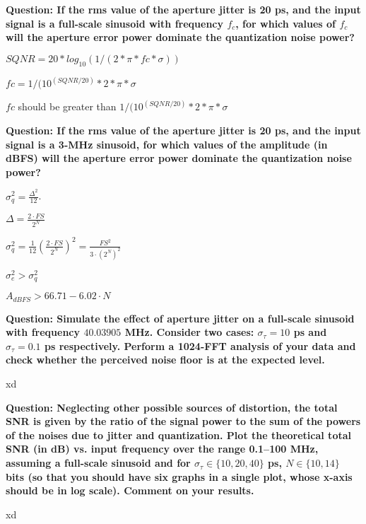 \textbf{Question: If the rms value of the aperture jitter is 20 ps, and the input signal is a full-scale sinusoid with frequency $f_c$,
    for which values of $f_c$ will the aperture error power dominate the quantization noise power?
}
\vspace{0.5cm}

$SQNR = 20 * log_{10}(1 / (2*\pi*fc*\sigma))$

$fc = 1 / ( 10^(SQNR / 20) * 2*\pi*\sigma $

$fc$ should be greater than $1 / ( 10^(SQNR / 20) * 2*\pi*\sigma $

\vspace{1cm}
\textbf{Question: If the rms value of the aperture jitter is 20 ps, and the input signal is a 3-MHz sinusoid, for which values of the amplitude
    (in dBFS) will the aperture error power dominate the quantization noise power?
}
\vspace{0.5cm}

$\sigma_{q}^{2}=\frac{\Delta^{2}}{12}$.

$\Delta=\frac{2\cdot FS}{2^{N}}$

$\sigma_{q}^{2} = \frac{1}{12} \left( \frac{2 \cdot FS}{2^N} \right)^2 = \frac{FS^2}{3 \cdot (2^N)^2}$

$\sigma_e^2 > \sigma_q^2$

$A_{dBFS} > 66.71 - 6.02 \cdot N$


\vspace{1cm}
\textbf{Question: Simulate the effect of aperture jitter on a full-scale sinusoid with frequency $40.03905$ MHz.
    Consider two cases: $\sigma_\tau = 10$ ps and $\sigma_\tau=0.1$ ps respectively.
    Perform a 1024-FFT analysis of your data and check whether the perceived noise floor is at the expected level.
}
\vspace{0.5cm}

xd

\vspace{1cm}
\textbf{Question: Neglecting other possible sources of distortion, the total SNR is given by the ratio of the signal
    power to the sum of the powers of the noises due to jitter and quantization. Plot the theoretical total SNR (in dB) vs.
    input frequency over the range 0.1--100 MHz, assuming a full-scale sinusoid and for $\sigma_\tau \in \{10,20,40\}$ ps,
    $N\in \{10, 14\}$ bits (so that you should have six graphs in a single plot, whose x-axis should be in log scale).
    Comment on your results.
}
\vspace{0.5cm}

xd
